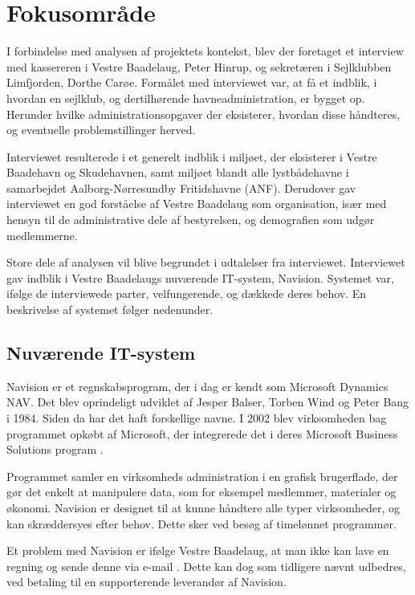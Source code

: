 \section{Fokusområde} %

I forbindelse med analysen af projektets kontekst, blev der foretaget et interview med kassereren i Vestre Baadelaug, Peter Hinrup, og sekretæren i Sejlklubben Limfjorden, Dorthe Carøe. Formålet med interviewet var, at få et indblik, i hvordan en sejlklub, og dertilhørende havneadministration, er bygget op. Herunder hvilke administrationsopgaver der eksisterer, hvordan disse håndteres, og eventuelle problemstillinger herved.

Interviewet resulterede i et generelt indblik i miljøet, der eksisterer i Vestre Baadehavn og Skudehavnen, samt miljøet blandt alle lystbådehavne i samarbejdet Aalborg-Nørresundby Fritidshavne (ANF). Derudover gav interviewet en god forståelse af Vestre Baadelaug som organisation, især med hensyn til de administrative dele af bestyrelsen, og demografien som udgør medlemmerne.

Store dele af analysen vil blive begrundet i udtalelser fra interviewet. Interviewet gav indblik i Vestre Baadelaugs nuværende IT-system, Navision. Systemet var, ifølge de interviewede parter, velfungerende, og dækkede deres behov. En beskrivelse af systemet følger nedenunder. 

\subsection{Nuværende IT-system} %
\label{sub:nuv_it_system}

Navision er et regnskabsprogram, der i dag er kendt som Microsoft Dynamics NAV. Det blev oprindeligt udviklet af Jesper Balser, Torben Wind og Peter Bang i 1984. Siden da har det haft forskellige navne. I 2002 blev virksomheden bag programmet opkøbt af Microsoft, der integrerede det i deres Microsoft Business Solutions program \cite{visiondata}.

Programmet samler en virksomheds administration i en grafisk brugerflade, der gør det enkelt at manipulere data, som for eksempel medlemmer, materialer og økonomi. Navision er designet til at kunne håndtere alle typer virksomheder, og kan skræddersyes efter behov. Dette sker ved besøg af timelønnet programmør.

Et problem med Navision er ifølge Vestre Baadelaug, at man ikke kan lave en regning og sende denne via e-mail \cite{int_vb_sl}. Dette kan dog som tidligere nævnt udbedres, ved betaling til en supporterende leverandør af Navision.

